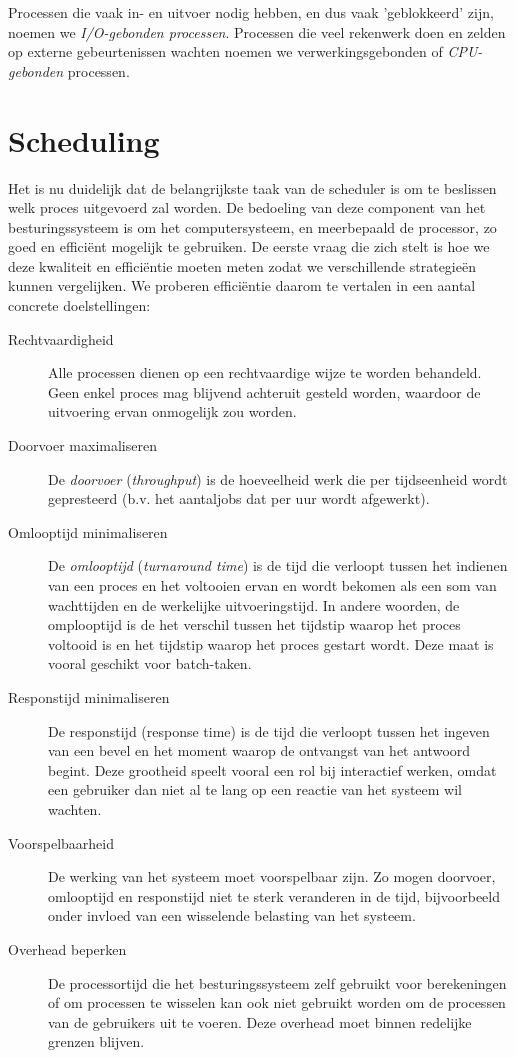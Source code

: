 Processen die vaak in- en uitvoer nodig hebben, en dus vaak
'geblokkeerd' zijn, noemen we \emph{I/O-gebonden
processen}. Processen die veel rekenwerk doen en zelden op
externe gebeurtenissen wachten noemen we verwerkingsgebonden of
\emph{CPU-gebonden} processen.


\section{Scheduling}

Het is nu duidelijk dat de belangrijkste taak van de scheduler is
om te beslissen welk proces uitgevoerd zal worden. De bedoeling van deze
component van het besturingssysteem is om het computersysteem, en
meerbepaald de processor, zo goed en effici\"ent mogelijk te gebruiken. De
eerste vraag die zich stelt is hoe we deze kwaliteit en effici\"entie
moeten meten zodat we verschillende strategie\"en kunnen vergelijken. We
proberen effici\"entie daarom te vertalen in een aantal concrete
doelstellingen:

\begin{description}
\item[Rechtvaardigheid] Alle processen dienen op een rechtvaardige wijze te
worden behandeld. Geen enkel proces mag blijvend achteruit gesteld worden,
waardoor de uitvoering ervan onmogelijk zou worden.
\item[Doorvoer maximaliseren] De \emph{doorvoer}
(\emph{throughput}) is de hoeveelheid werk die per tijdseenheid
wordt gepresteerd (b.v. het aantaljobs dat per uur wordt afgewerkt).
\item[Omlooptijd minimaliseren] De \emph{omlooptijd}
(\emph{turnaround time}) is de tijd die verloopt tussen het
indienen van een proces en het voltooien ervan en wordt bekomen als een som van
wachttijden en de werkelijke uitvoeringstijd. In andere woorden, de omplooptijd
is de het verschil tussen het tijdstip waarop het proces voltooid is en het
tijdstip waarop het proces gestart wordt. Deze maat is vooral geschikt voor
batch-taken.
\item[Responstijd minimaliseren] De responstijd (response time) is de tijd die
verloopt tussen het ingeven van een bevel en het moment waarop de ontvangst van
het antwoord begint. Deze grootheid speelt vooral een rol bij interactief
werken, omdat een gebruiker dan niet al te lang op een reactie van het systeem
wil wachten.
\item[Voorspelbaarheid] De werking van het systeem moet voorspelbaar zijn. Zo
mogen doorvoer, omlooptijd en responstijd niet te sterk veranderen in de tijd,
bijvoorbeeld onder invloed van een wisselende belasting van het systeem.
\item[Overhead beperken] De processortijd die het besturingssysteem zelf
gebruikt voor berekeningen of om processen te wisselen kan ook niet gebruikt
worden om de processen van de gebruikers uit te voeren. Deze overhead moet
binnen redelijke grenzen blijven.
\end{description}

